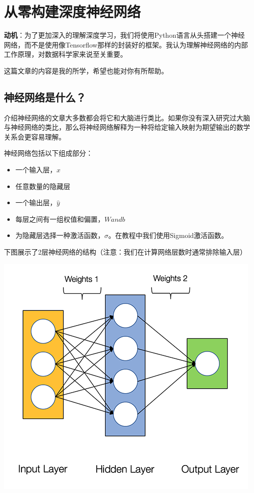 
\chapter{从零构建深度神经网络}

\textbf{动机}：为了更加深入的理解深度学习，我们将使用Python语言从头搭建一个神经网络，而不是使用像Tensorflow那样的封装好的框架。我认为理解神经网络的内部工作原理，对数据科学家来说至关重要。

这篇文章的内容是我的所学，希望也能对你有所帮助。

\section{神经网络是什么？}

介绍神经网络的文章大多数都会将它和大脑进行类比。如果你没有深入研究过大脑与神经网络的类比，那么将神经网络解释为一种将给定输入映射为期望输出的数学关系会更容易理解。

神经网络包括以下组成部分：

\begin{itemize}
    \item 一个输入层，$x$
    \item 任意数量的隐藏层
    \item 一个输出层，$\hat{y}$
    \item 每层之间有一组权值和偏置，$W and b$
    \item 为隐藏层选择一种激活函数，$\sigma$。在教程中我们使用Sigmoid激活函数。
\end{itemize}

下图展示了2层神经网络的结构（注意：我们在计算网络层数时通常排除输入层）

\noindent\includegraphics[width=\textwidth]{1.png}

